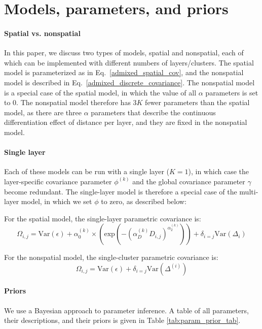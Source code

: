\documentclass[10pt,letterpaper]{article}
\begin{document}
\section*{Models, parameters, and priors}\label{model_app}
\paragraph{Spatial vs. nonspatial}
In this paper, we discuss two types of models, spatial and nonspatial, 
each of which can be implemented with different numbers of layers/clusters.
The spatial model is parameterized as in Eq.\ \eqref{admixed_spatial_cov},
and the nonspatial model is described in Eq.\ \eqref{admixed_discrete_covariance}.
The nonspatial model is a special case of the spatial model, 
in which the value of all $\alpha$ parameters is set to 0.
The nonspatial model therefore has $3K$ fewer parameters than the spatial model,
as there are three $\alpha$ parameters that describe the continuous differentiation effect of distance per layer,
and they are fixed in the nonspatial model.

\paragraph{Single layer}
Each of these models can be run with a single layer ($K=1$), 
in which case the layer-specific covariance parameter $\phi^{(k)}$ 
and the global covariance parameter $\gamma$ become redundant.
The single-layer model is therefore a special case of the multi-layer model, 
in which we set $\phi$ to zero, as described below:

For the spatial model, the single-layer parametric covariance is:
\begin{equation}
\Omega_{i,j} = \text{Var}(\epsilon) + 
\alpha^{(k)}_0 \times \left(\text{exp} \left(  -(\alpha^{(k)}_D D_{i,j})^{\alpha^{(k)}_2}\right) \right)	 +
\delta_{i=j} \text{Var}(\Delta_i)
\label{admixed_continuous_cov}
\end{equation}

For the nonspatial model, the single-cluster parametric covariance is:
\begin{equation}
\Omega_{i,j} = \text{Var}(\epsilon) + \delta_{i=j} \text{Var}(\Delta^{(i)})
\label{admixed_discrete_covariance}
\end{equation}

\paragraph{Priors}
We use a Bayesian approach to parameter inference.
A table of all parameters, their descriptions, and their priors is given in Table \ref{tab:param_prior_tab}.
\end{document}
